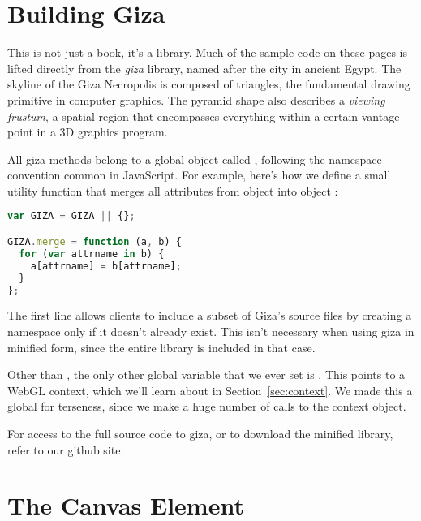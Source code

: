 \section{Building Giza}

This is not just a book, it's a library.  Much of the sample code on these pages is lifted directly from the \emph{giza} library, named after the city in ancient Egypt.  The skyline of the Giza Necropolis is composed of triangles, the fundamental drawing primitive in computer graphics.  The pyramid shape also describes a \emph{viewing frustum}, a spatial region that encompasses everything within a certain vantage point in a 3D graphics program.

All giza methods belong to a global object called , following the namespace convention common in JavaScript.  For example, here's how we define a small utility function that merges all attributes from object  into object :

\begin{lstlisting}[language=JavaScript]
var GIZA = GIZA || {};

GIZA.merge = function (a, b) {
  for (var attrname in b) {
    a[attrname] = b[attrname];
  }
};
\end{lstlisting}

The first line allows clients to include a subset of Giza's source files by creating a  namespace only if it doesn't already exist.  This isn't necessary when using giza in minified form, since the entire library is included in that case.

Other than , the only other global variable that we ever set is .  This points to a WebGL context, which we'll learn about in Section~\ref{sec:context}.  We made this a global for terseness, since we make a huge number of calls to the context object.

For access to the full source code to giza, or to download the minified library, refer to our github site:


\section{The Canvas Element}

